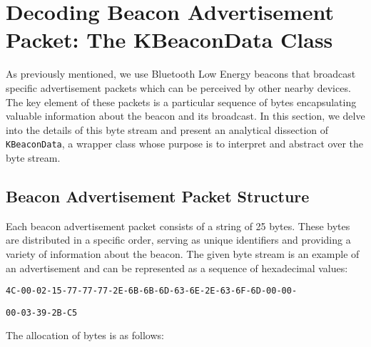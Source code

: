 
\section{Decoding Beacon Advertisement Packet: The KBeaconData Class}

As previously mentioned, we use Bluetooth Low Energy beacons that broadcast specific advertisement packets which can be perceived by other nearby devices.
The key element of these packets is a particular sequence of bytes encapsulating valuable information about the beacon and its broadcast. 
In this section, we delve into the details of this byte stream and present an analytical dissection of \texttt{KBeaconData}, a wrapper class whose purpose is to interpret and abstract over the byte stream.

\subsection{Beacon Advertisement Packet Structure}
	 
Each beacon advertisement packet consists of a string of 25 bytes.
These bytes are distributed in a specific order, serving as unique identifiers and providing a variety of information about the beacon. 
The given byte stream is an example of an advertisement and can be represented as a sequence of hexadecimal values:


\noindent\texttt{4C-00-02-15-77-77-77-2E-6B-6B-6D-63-6E-2E-63-6F-6D-00-00-}


\noindent\texttt{00-03-39-2B-C5}


The allocation of bytes is as follows:

